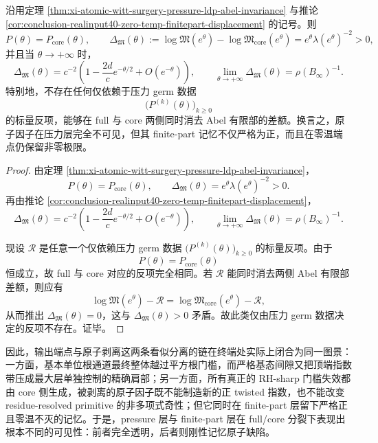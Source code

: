 \begin{corollary}[压力透明而有限部记忆不可压平]\label{cor:xi-time-part9wa-pressure-blind-finitepart-memory}
沿用定理 \ref{thm:xi-atomic-witt-surgery-pressure-ldp-abel-invariance} 与推论 \ref{cor:conclusion-realinput40-zero-temp-finitepart-displacement} 的记号。则
\[
P(\theta)=P_{\mathrm{core}}(\theta),
\qquad
\Delta_{\mathfrak M}(\theta)
:=
\log\mathfrak M(e^\theta)-\log\mathfrak M_{\mathrm{core}}(e^\theta)
=
e^\theta\lambda(e^\theta)^{-2}
>0,
\]
并且当 \(\theta\to+\infty\) 时，
\[
\Delta_{\mathfrak M}(\theta)
=
c^{-2}\left(1-\frac{2d}{c}e^{-\theta/2}+O(e^{-\theta})\right),
\qquad
\lim_{\theta\to+\infty}\Delta_{\mathfrak M}(\theta)=\rho(B_\infty)^{-1}.
\]
特别地，不存在任何仅依赖于压力 germ 数据
\[
\bigl(P^{(k)}(\theta)\bigr)_{k\ge 0}
\]
的标量反项，能够在 full 与 core 两侧同时消去 Abel 有限部的差额。换言之，原子因子在压力层完全不可见，但其 finite-part 记忆不仅严格为正，而且在零温端点仍保留非零极限。
\end{corollary}
\begin{proof}
由定理 \ref{thm:xi-atomic-witt-surgery-pressure-ldp-abel-invariance}，
\[
P(\theta)=P_{\mathrm{core}}(\theta),
\qquad
\Delta_{\mathfrak M}(\theta)=e^\theta\lambda(e^\theta)^{-2}>0.
\]
再由推论 \ref{cor:conclusion-realinput40-zero-temp-finitepart-displacement}，
\[
\Delta_{\mathfrak M}(\theta)
=
c^{-2}\left(1-\frac{2d}{c}e^{-\theta/2}+O(e^{-\theta})\right),
\qquad
\lim_{\theta\to+\infty}\Delta_{\mathfrak M}(\theta)=\rho(B_\infty)^{-1}.
\]

现设 \(\mathcal R\) 是任意一个仅依赖压力 germ 数据 \(\bigl(P^{(k)}(\theta)\bigr)_{k\ge 0}\) 的标量反项。由于
\[
P(\theta)=P_{\mathrm{core}}(\theta)
\]
恒成立，故 full 与 core 对应的反项完全相同。若 \(\mathcal R\) 能同时消去两侧 Abel 有限部差额，则应有
\[
\log\mathfrak M(e^\theta)-\mathcal R
=
\log\mathfrak M_{\mathrm{core}}(e^\theta)-\mathcal R,
\]
从而推出 \(\Delta_{\mathfrak M}(\theta)=0\)，这与 \(\Delta_{\mathfrak M}(\theta)>0\) 矛盾。故此类仅由压力 germ 数据决定的反项不存在。证毕。
\end{proof}

\noindent
因此，输出端点与原子剥离这两条看似分离的链在终端处实际上闭合为同一图景：一方面，基本单位根通道最终整体越过平方根门槛，而严格基态间隙又把顶端指数带压成最大层单独控制的精确肩部；另一方面，所有真正的 RH-sharp 门槛失效都由 core 侧生成，被剥离的原子因子既不能制造新的正 twisted 指数，也不能改变 residue-resolved primitive 的非多项式奇性；但它同时在 finite-part 层留下严格正且零温不灭的记忆。于是，pressure 层与 finite-part 层在 full/core 分裂下表现出根本不同的可见性：前者完全透明，后者则刚性记忆原子缺陷。

\endinput
